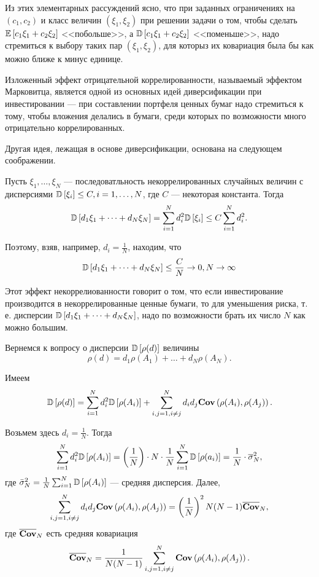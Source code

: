 Из этих элементарных рассуждений ясно, что при заданных ограничениях на $(c_1, c_2)$ и класс величин $(\xi_1, \xi_2)$ при решении задачи о том,
чтобы сделать $\mathbb{E}\left[c_1 \xi_1 + c_2 \xi_2\right]$ <<побольше>>, а $\mathbb{D}\left[c_1 \xi_1 + c_2 \xi_2\right]$ <<поменьше>>, надо стремиться к выбору таких пар 
$(\xi_1, \xi_2)$, для которыз их ковариация была бы как можно ближе к минус единице.

Изложенный эффект отрицательной коррелированности, называемый эффектом Марковитца, является одной из основных идей диверсификации при инвестировании ---
при составлении портфеля ценных бумаг надо стремиться к тому, чтобы вложения делались в бумаги, среди которых по возможности много отрицательно коррелированных.

Другая идея, лежащая в основе диверсификации, основана на следующем соображении.

Пусть $\xi_1, \dots, \xi_N$ --- последоватльность некоррелированных случайных величин с дисперсиями $\mathbb{D}\left[\xi_i\right] \le C, i=1, \dots, N$, 
где $C$ --- некоторая константа. Тогда
\[
\mathbb{D}\left[d_1 \xi_1 + \dots + d_N \xi_N\right] = \sum_{i=1}^{N} d_i^2 \mathbb{D}\left[\xi_i\right] \le C \sum_{i=1}^{N} d_i^2 .
\]

Поэтому, взяв, например, $d_i = \frac{1}{N}$, находим, что
\[
\mathbb{D}\left[d_1 \xi_1 + \dots + d_N \xi_N\right] \le \frac{C}{N} \rightarrow 0, N \rightarrow \infty
\]

Этот эффект некоррелиованности говорит о том, что если инвестирование производится в некоррелированные ценные бумаги, то для уменьшения риска,
т. е. дисперсии $\mathbb{D}\left[d_1 \xi_1 + \dots + d_N \xi_N\right]$, надо по возможности брать их число $N$ как можно большим.

Вернемся к вопросу о дисперсии $\mathbb{D}\left[\rho(d)\right]$ величины
\[
\rho(d) = d_1 \rho(A_1) + \dots + d_N \rho(A_N) .
\]

Имеем
\[
\mathbb{D}\left[\rho(d)\right] = \sum_{i=1}^{N} d_i^2 \mathbb{D}\left[\rho(A_i)\right] + \sum_{i, j = 1, i \ne j}^{N} d_i d_j \textbf{Cov}\left(\rho(A_i), \rho(A_j)\right) .
\]

Возьмем здесь $d_i = \frac{1}{N}$. Тогда
\[
\sum_{i=1}^{N} d_i^2 \mathbb{D}\left[\rho(A_i)\right] = 
	\left(\frac{1}{N}\right) \cdot N \cdot \frac{1}{N} \sum_{i=1}^{N} \mathbb{D}\left[\rho(a_i)\right] =
	\frac{1}{N} \cdot \overline{\sigma}_N^2 ,
\]
где $\bar{\sigma}_N^2 = \frac{1}{N} \sum_{i=1}^{N} \mathbb{D}\left[\rho(A_i)\right]$ --- средняя дисперсия. Далее,
\[
\sum_{i, j = 1, i \ne j}^{N} d_i d_j \textbf{Cov}\left(\rho(A_i), \rho(A_j)\right) =
	\left(\frac{1}{N}\right)^2 N (N - 1) \overline{\textbf{Cov}}_N ,
\]
где $\overline{\textbf{Cov}}_N$ есть средняя ковариация
\[
\overline{\textbf{Cov}}_N = \frac{1}{N (N - 1)} \sum_{i, j = 1, i \ne j}^{N} \textbf{Cov}\left(\rho(A_i), \rho(A_j)\right) .
\]

